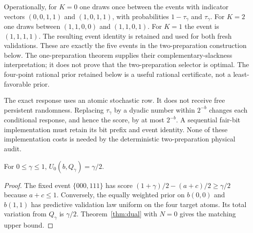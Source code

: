 Operationally, for $K=0$ one draws once between the events with indicator
vectors $(0,0,1,1)$ and $(1,0,1,1)$, with probabilities $1-\tau_\gamma$
and $\tau_\gamma$. For $K=2$ one draws between $(1,1,0,0)$ and
$(1,1,0,1)$. For $K=1$ the event is $(1,1,1,1)$. The resulting event
identity is retained and used for both fresh validations. These are
exactly the five events in the two-preparation construction below.
The one-preparation theorem supplies their complementary-slackness
interpretation; it does not prove that the two-preparation selector is
optimal. The four-point rational prior retained below is a useful
rational certificate, not a least-favorable prior.

The exact response uses an atomic stochastic row. It does not receive
free persistent randomness. Replacing $\tau_\gamma$ by a dyadic number
within $2^{-b}$ changes each conditional response, and hence the score,
by at most $2^{-b}$. A sequential fair-bit implementation must retain its
bit prefix and event identity. None of these implementation costs is
needed by the deterministic two-preparation physical audit.

\begin{proposition}\label{prop:marked-zero}
For $0\le\gamma\le1$, $U_0(b,Q_\gamma)=\gamma/2$.
\end{proposition}
\begin{proof}
The fixed event $\{000,111\}$ has score
$(1+\gamma)/2-(a+c)/2\ge\gamma/2$ because $a+c\le1$.
Conversely, the equally weighted prior on $b(0,0)$ and $b(1,1)$ has
predictive validation law uniform on the four target atoms. Its total
variation from $Q_\gamma$ is $\gamma/2$. Theorem~\ref{thm:dual} with
$N=0$ gives the matching upper bound.
\end{proof}

